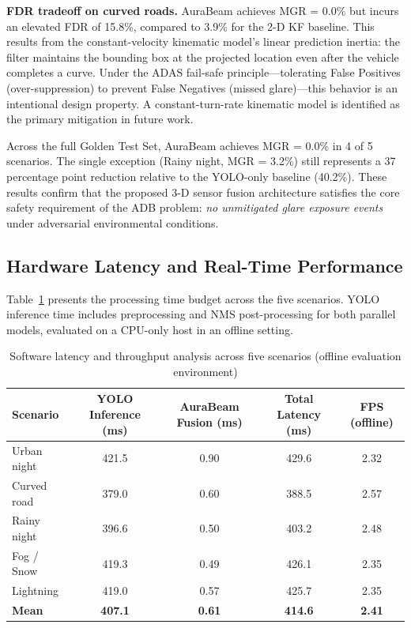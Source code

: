 \documentclass[pdflatex,sn-mathphys-num]{sn-jnl}%
\theoremstyle{thmstyleone}%
\theoremstyle{thmstyletwo}%
\theoremstyle{thmstylethree}%
\begin{document}
\textbf{FDR tradeoff on curved roads.} AuraBeam achieves MGR = 0.0\%
but incurs an elevated FDR of 15.8\%, compared to 3.9\% for the 2-D
KF baseline. This results from the constant-velocity kinematic model's
linear prediction inertia: the filter maintains the bounding box at
the projected location even after the vehicle completes a curve.
Under the ADAS fail-safe principle---tolerating False Positives
(over-suppression) to prevent False Negatives (missed glare)---this
behavior is an intentional design property. A constant-turn-rate
kinematic model is identified as the primary mitigation in future
work.

Across the full Golden Test Set, AuraBeam achieves MGR = 0.0\% in 4
of 5 scenarios. The single exception (Rainy night, MGR = 3.2\%) still
represents a 37 percentage point reduction relative to the YOLO-only
baseline (40.2\%). These results confirm that the proposed 3-D sensor
fusion architecture satisfies the core safety requirement of the ADB
problem: \emph{no unmitigated glare exposure events} under adversarial
environmental conditions.

\subsection{Hardware Latency and Real-Time Performance}
\label{subsec:res_hw}

Table~\ref{tab:latency_all} presents the processing time budget across
the five scenarios. YOLO inference time includes preprocessing and
NMS post-processing for both parallel models, evaluated on a CPU-only
host in an offline setting.

\begin{table}[t]
\centering
\caption{Software latency and throughput analysis across five scenarios
         (offline evaluation environment)}
\label{tab:latency_all}
%
\begin{tabular}{lcccc}
\hline
\textbf{Scenario}
  & \textbf{YOLO Inference (ms)}
  & \textbf{AuraBeam Fusion (ms)}
  & \textbf{Total Latency (ms)}
  & \textbf{FPS (offline)} \\
\hline
Urban night    & 421.5 & 0.90 & 429.6 & 2.32 \\
Curved road    & 379.0 & 0.60 & 388.5 & 2.57 \\
Rainy night    & 396.6 & 0.50 & 403.2 & 2.48 \\
Fog / Snow     & 419.3 & 0.49 & 426.1 & 2.35 \\
Lightning      & 419.0 & 0.57 & 425.7 & 2.35 \\
\hline
\textbf{Mean}  & \textbf{407.1} & \textbf{0.61}
               & \textbf{414.6} & \textbf{2.41} \\
\hline
\end{tabular}%
\end{table}
\end{document}
